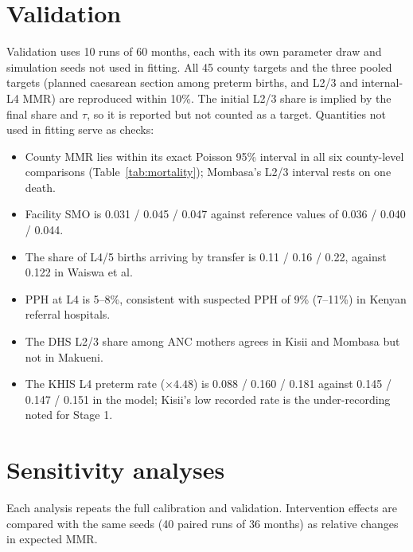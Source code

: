 \documentclass[11pt]{article}
\begin{document}
\section{Validation}

Validation uses 10 runs of 60 months, each with its own parameter draw and
simulation seeds not used in fitting. All 45 county targets and the three
pooled targets (planned caesarean section among preterm births, and L2/3 and
internal-L4 MMR) are reproduced within 10\%. The initial L2/3 share is implied
by the final share and $\tau$, so it is reported but not counted as a target.
Quantities not used in fitting serve as checks:
\begin{itemize}
\item County MMR lies within its exact Poisson 95\% interval in all six
county-level comparisons (Table~\ref{tab:mortality}); Mombasa's L2/3 interval
rests on one death.
\item Facility SMO is 0.031 / 0.045 / 0.047 against reference values of 0.036 /
0.040 / 0.044.
\item The share of L4/5 births arriving by transfer is 0.11 / 0.16 / 0.22,
against 0.122 in Waiswa et al.
\item PPH at L4 is 5--8\%, consistent with suspected PPH of 9\% (7--11\%) in
Kenyan referral hospitals.
\item The DHS L2/3 share among ANC mothers agrees in Kisii and Mombasa but not
in Makueni.
\item The KHIS L4 preterm rate ($\times 4.48$) is 0.088 / 0.160 / 0.181 against
0.145 / 0.147 / 0.151 in the model; Kisii's low recorded rate is the
under-recording noted for Stage 1.
\end{itemize}

\section{Sensitivity analyses}
\label{sec:sensitivity}

Each analysis repeats the full calibration and validation. Intervention effects are
compared with the same seeds (40 paired runs of 36 months) as relative changes
in expected MMR.
\end{document}

